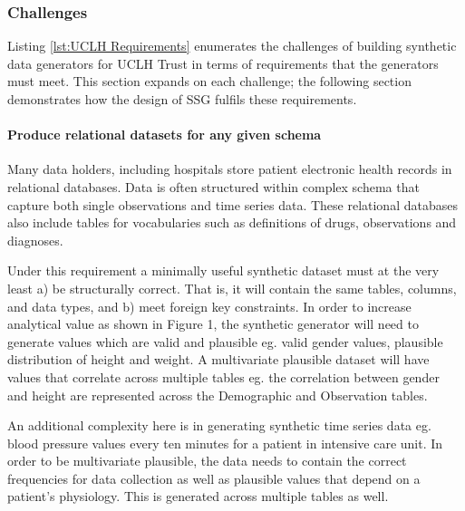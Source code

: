 \documentclass[11pt]{article}
\begin{document}
\subsubsection{Challenges}

Listing \ref{lst:UCLH Requirements} enumerates the challenges of building synthetic data generators for UCLH Trust in terms of requirements that the generators must meet. This section expands on each challenge; the following section demonstrates how the design of SSG fulfils these requirements.


\paragraph{Produce relational datasets for any given schema}

Many data holders, including hospitals store patient electronic health records in relational databases. Data is often structured within complex schema that capture both single observations and time series data. These relational databases also include tables for vocabularies such as definitions of drugs, observations and diagnoses. 

Under this requirement a minimally useful synthetic dataset must at the very least a) be structurally correct. That is, it will contain the same tables, columns, and data types, and b) meet foreign key constraints. In order to increase analytical value as shown in Figure 1, the synthetic generator will need to generate values which are valid and plausible eg. valid gender values, plausible distribution of height and weight.  A multivariate plausible dataset will have values that correlate across multiple tables eg. the correlation between gender and height are represented across the Demographic and Observation tables. 

An additional complexity here is in generating synthetic time series data eg. blood pressure values every ten minutes for a patient in intensive care unit. In order to be multivariate plausible, the data needs to contain the correct frequencies for data collection as well as plausible values that depend on a patient's physiology. This is generated across multiple tables as well.  
\end{document}
